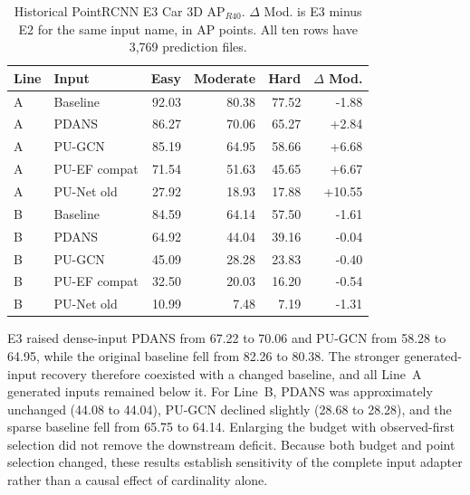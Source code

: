 \begin{table}[!t]\centering\setlength{\tabcolsep}{4pt}
\begin{tabular}{llrrrr}\toprule
Line & Input & Easy & Moderate & Hard & $\Delta$ Mod.\\\midrule

A & Baseline & 92.03 & 80.38 & 77.52 & -1.88\\

A & PDANS & 86.27 & 70.06 & 65.27 & +2.84\\

A & PU-GCN & 85.19 & 64.95 & 58.66 & +6.68\\

A & PU-EF compat & 71.54 & 51.63 & 45.65 & +6.67\\

A & PU-Net old & 27.92 & 18.93 & 17.88 & +10.55\\

\midrule

B & Baseline & 84.59 & 64.14 & 57.50 & -1.61\\

B & PDANS & 64.92 & 44.04 & 39.16 & -0.04\\

B & PU-GCN & 45.09 & 28.28 & 23.83 & -0.40\\

B & PU-EF compat & 32.50 & 20.03 & 16.20 & -0.54\\

B & PU-Net old & 10.99 & 7.48 & 7.19 & -1.31\\

\bottomrule\end{tabular}
\caption{Historical PointRCNN E3 Car 3D AP$_{R40}$. $\Delta$ Mod. is E3
minus E2 for the same input name, in AP points. All ten rows have 3,769
prediction files.}\label{tab:k-e3}\end{table}

E3 raised dense-input PDANS from 67.22 to 70.06 and PU-GCN from
58.28 to 64.95, while the original baseline fell from 82.26 to 80.38.
The stronger generated-input recovery therefore coexisted with a
changed baseline, and all Line~A generated inputs remained below it.
For Line~B, PDANS was approximately unchanged (44.08 to 44.04),
PU-GCN declined slightly (28.68 to 28.28), and the sparse baseline
fell from 65.75 to 64.14. Enlarging the budget with observed-first
selection did not remove the downstream deficit. Because both budget
and point selection changed, these results establish sensitivity of
the complete input adapter rather than a causal effect of cardinality
alone.

\FloatBarrier

